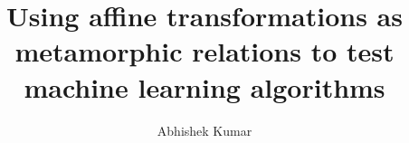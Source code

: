 \documentclass[print,ms]{unothesis}
\begin{document}

\title{Using affine transformations as metamorphic relations to test machine learning algorithms}

\author{Abhishek Kumar}
\memberc{\ } %

\maketitle
\end{document}
